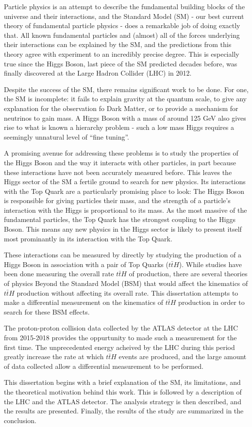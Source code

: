 Particle physics is an attempt to describe the fundamental building blocks of the universe and their interactions, and the Standard Model (SM) - our best current theory of fundamental particle physics - does a remarkable job of doing exactly that. All known fundamental particles and (almost) all of the forces underlying their interactions can be explained by the SM, and the predictions from this theory agree with experiment to an incredibly precise degree. This is especially true since the Higgs Boson, last piece of the SM predicted decades before, was finally discovered at the Large Hadron Collider (LHC) in 2012. 

Despite the success of the SM, there remains significant work to be done. For one, the SM is incomplete: it fails to explain gravity at the quantum scale, to give any explanation for the observation fo Dark Matter, or to provide a mechanism for neutrinos to gain mass. A Higgs Boson with a mass of around 125 GeV also gives rise to what is known a hierarchy problem - such a low mass Higgs requires a seemingly unnatural level of ``fine tuning''. 

A promising avenue for addressing these problems is to study the properties of the Higgs Boson and the way it interacts with other particles, in part because these interactions have not been accurately measured before. This leaves the Higgs sector of the SM a fertile ground to search for new physics. Its interactions with the Top Quark are a particularly promising place to look: The Higgs Boson is responsible for giving particles their mass, and the strength of a particle's interaction with the Higgs is proportional to its mass. As the most massive of the fundamental particles, the Top Quark has the strongest coupling to the Higgs Boson. This means any new physics in the Higgs sector is likely to present itself most prominantly in its interaction with the Top Quark.

These interactions can be measured by directly by studying the production of a Higgs Boson in association with a pair of Top Quarks ($t\bar{t}H$). While studies have been done measuring the overall rate $t\bar{t}H$ of production, there are several theories of physics Beyond the Standard Model (BSM) that would affect the kinematics of $t\bar{t}H$ production without affecting its overall rate. This dissertation attempts to make a differential measurement on the kinematics of $t\bar{t}H$ production in order to search for these BSM effects.

The proton-proton collision data collected by the ATLAS detector at the LHC from 2015-2018 provides the oppurtunity to made such a measurement for the first time. The unprecedented energy acheived by the LHC during this period greatly increase the rate at which $t\bar{t}H$ events are produced, and the large amount of data collected allow a differential measurement to be performed.

This dissertation begins with a brief explanation of the SM, its limitations, and the theoretical motivation behind this work. This is followed by a description of the LHC and the ATLAS detector. The analysis strategy is then described, and the results are presented. Finally, the results of the study are summarized in the conclusion.